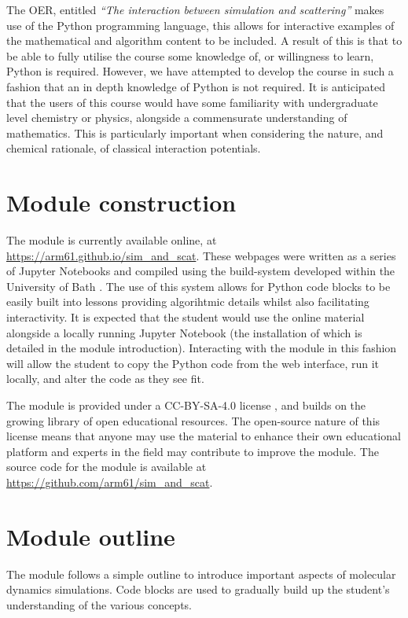 \documentclass[amsmath,amssymb,twocolumn,superscriptaddress]{revtex4-1}
\begin{document}
The OER, entitled \emph{``The interaction between simulation and scattering''} makes use of the Python programming language, this allows for interactive examples of the mathematical and algorithm content to be included.
A result of this is that to be able to fully utilise the course some knowledge of, or willingness to learn, Python is required.
However, we have attempted to develop the course in such a fashion that an in depth knowledge of Python is not required.
It is anticipated that the users of this course would have some familiarity with undergraduate level chemistry or physics, alongside a commensurate understanding of mathematics.
This is particularly important when considering the nature, and chemical rationale, of classical interaction potentials.

\section{Module construction}

The module is currently available online, at \url{https://arm61.github.io/sim_and_scat}.
These webpages were written as a series of Jupyter Notebooks and compiled using the build-system developed within the University of Bath \cite{betteridge_jupyter_tutorial_2019}.
The use of this system allows for Python code blocks to be easily built into lessons providing algorihtmic details whilst also facilitating interactivity.
It is expected that the student would use the online material alongside a locally running Jupyter Notebook (the installation of which is detailed in the module introduction).
Interacting with the module in this fashion will allow the student to copy the Python code from the web interface, run it locally, and alter the code as they see fit.

The module is provided under a CC-BY-SA-4.0 license \cite{noauthor_creative_2019}, and builds on the growing library of open educational resources.
The open-source nature of this license means that anyone may use the material to enhance their own educational platform and experts in the field may contribute to improve the module.
The source code for the module is available at \url{https://github.com/arm61/sim_and_scat}.

\section{Module outline}

The module follows a simple outline to introduce important aspects of molecular dynamics simulations.
Code blocks are used to gradually build up the student's understanding of the various concepts.
\end{document}
